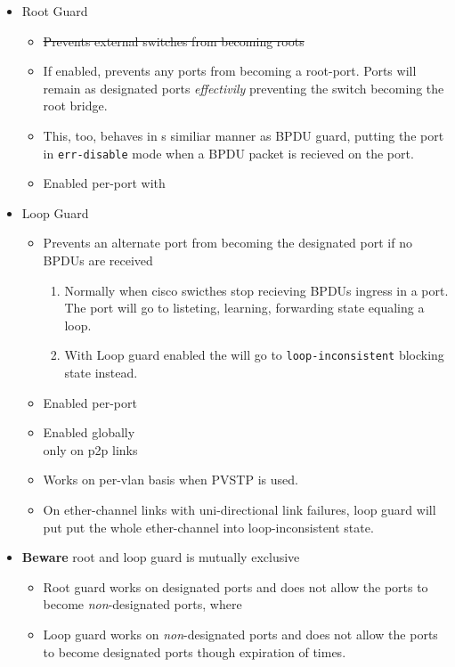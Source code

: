 \begin{itemize}
\begin{itemize}
    \end{itemize}
    \item Root Guard
    \begin{itemize}
        \item \st{Prevents external switches from becoming roots}
        \item If enabled, prevents any ports from becoming a root-port. Ports will remain as designated ports \textit{effectivily} preventing the switch becoming the root bridge.
        \item This, too, behaves in s similiar manner as BPDU guard, putting the port in \texttt{err-disable} mode when a BPDU packet is recieved on the port.
        \item Enabled per-port with\\
    \end{itemize}
    \item Loop Guard
    \begin{itemize}
        \item Prevents an alternate port from becoming the designated port if no BPDUs are received
        \begin{enumerate}
            \item Normally when cisco swicthes stop recieving BPDUs ingress in a port. The port will go to listeting, learning, forwarding state equaling a loop.
            \item With Loop guard enabled the will go to \texttt{loop-inconsistent} blocking state instead.
        \end{enumerate}
        \item Enabled per-port\\
        \item Enabled globally\\ {\small only on p2p links}
        \item Works on per-vlan basis when PVSTP is used.
        \item On ether-channel links with uni-directional link failures, loop guard will put put the whole ether-channel into loop-inconsistent state.
    \end{itemize}
    \item \textbf{Beware} root and loop guard is mutually exclusive
    \begin{itemize}
        \item Root guard works on designated ports and does not allow the ports to become \textit{non}-designated ports, where
        \item Loop guard works on \textit{non}-designated ports and does not allow the ports to become designated ports {\footnotesize though expiration of times}.
    \end{itemize}
\end{itemize}

